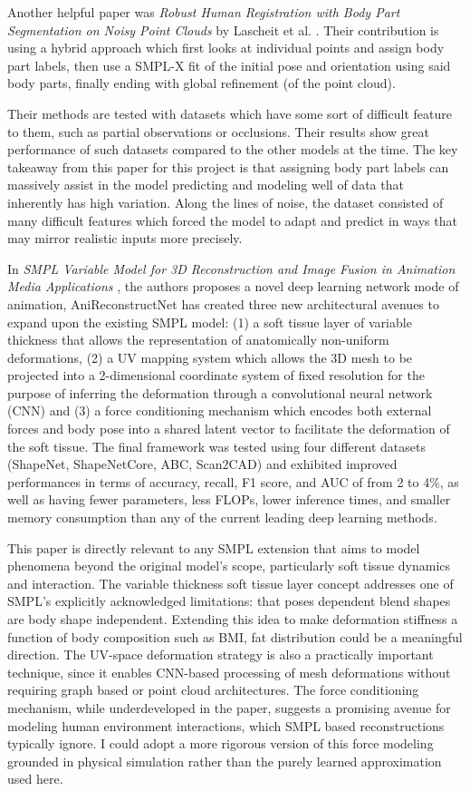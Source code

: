 \documentclass[final]{article}
\begin{document}
Another helpful paper was \textit{Robust Human Registration with Body Part Segmentation on Noisy Point Clouds} by Lascheit et al. \cite{LascheitBPGE25}. Their contribution is using a hybrid approach which first looks at individual points and assign body part labels, then use a SMPL-X fit of the initial pose and orientation using said body parts, finally ending with global refinement (of the point cloud).

Their methods are tested with datasets which have some sort of difficult feature to them, such as partial observations or occlusions. Their results show great performance of such datasets compared to the other models at the time. The key takeaway from this paper for this project is that assigning body part labels can massively assist in the model predicting and modeling well of data that inherently has high variation. Along the lines of noise, the dataset consisted of many difficult features which forced the model to adapt and predict in ways that may mirror realistic inputs more precisely.

In \textit{SMPL Variable Model for 3D Reconstruction and Image Fusion in Animation Media Applications} \cite{XieZ25}, the authors proposes a novel deep learning network mode of animation, AniReconstructNet has created three new architectural avenues to expand upon the existing SMPL model: (1) a soft tissue layer of variable thickness that allows the representation of anatomically non-uniform deformations, (2) a UV mapping system which allows the 3D mesh to be projected into a 2-dimensional coordinate system of fixed resolution for the purpose of inferring the deformation through a convolutional neural network (CNN) and (3) a force conditioning mechanism which encodes both external forces and body pose into a shared latent vector to facilitate the deformation of the soft tissue. The final framework was tested using four different datasets (ShapeNet, ShapeNetCore, ABC, Scan2CAD) and exhibited improved performances in terms of accuracy, recall, F1 score, and AUC of from 2 to 4\%, as well as having fewer parameters, less FLOPs, lower inference times, and smaller memory consumption than any of the current leading deep learning methods.

This paper is directly relevant to any SMPL extension that aims to model phenomena beyond the original model's scope, particularly soft tissue dynamics and interaction. The variable thickness soft tissue layer concept addresses one of SMPL's explicitly acknowledged limitations: that poses dependent blend shapes are body shape independent. Extending this idea to make deformation stiffness a function of body composition such as BMI, fat distribution could be a meaningful direction. The UV-space deformation strategy is also a practically important technique, since it enables CNN-based processing of mesh deformations without requiring graph based or point cloud architectures. The force conditioning mechanism, while underdeveloped in the paper, suggests a promising avenue for modeling human environment interactions, which SMPL based reconstructions typically ignore. I could adopt a more rigorous version of this force modeling grounded in physical simulation rather than the purely learned approximation used here.
\end{document}
